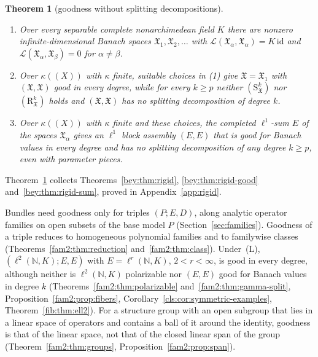 \documentclass[11pt]{amsart}
\theoremstyle{definition}
\theoremstyle{remark}
\numberwithin{equation}{section}
\newcommand{\N}{\mathbb N}
\newcommand{\cL}{\mathcal L}
\newcommand{\id}{\mathrm{id}}
\theoremstyle{plain}
\newtheorem{introtheorem}{Theorem}
\theoremstyle{definition}
\theoremstyle{plain}
\newcommand{\fX}{\mathfrak X}
\begin{document}
\begin{introtheorem}[goodness without splitting decompositions]\label{intro:thm:F}
\begin{enumerate}
\item Over every separable complete nonarchimedean field $K$ there are nonzero infinite-dimensional Banach spaces
$\fX_1,\fX_2,\dots$ with $\cL(\fX_\alpha,\fX_\alpha)=K\,\id$ and $\cL(\fX_\alpha,\fX_\beta)=0$ for $\alpha\ne\beta$.
\item Over $\kappa((X))$ with $\kappa$ finite, suitable choices in \textup{(1)} give $\fX=\fX_1$ with
$(\fX,\fX)$ good in every degree, while for every $k\ge p$ neither $(\mathrm S^k_{\fX})$ nor $(\mathrm R^k_{\fX})$
holds and $(\fX,\fX)$ has no splitting decomposition of degree $k$.
\item Over $\kappa((X))$ with $\kappa$ finite and these choices, the completed $\ell^1$-sum $E$ of the spaces $\fX_\alpha$
gives an $\ell^1$ block assembly $(E,E)$ that is good for Banach values in every degree and has no splitting
decomposition of any degree $k\ge p$, even with parameter pieces.
\end{enumerate}
\end{introtheorem}

Theorem~\ref{intro:thm:F} collects Theorems~\ref{bey:thm:rigid}, \ref{bey:thm:rigid-good} and~\ref{bey:thm:rigid-sum},
proved in Appendix~\ref{app:rigid}.

Bundles need goodness only for triples $(P;E,D)$, along analytic operator families on open subsets of the base model
$P$ (Section~\ref{sec:families}). Goodness of a triple reduces to homogeneous polynomial families and to familywise classes
(Theorems~\ref{fam2:thm:reduction} and~\ref{fam2:thm:class}). Under~\textup{(L)}, $(\ell^2(\N,K);E,E)$ with
$E=\ell^r(\N,K)$, $2<r<\infty$, is good in every degree, although neither is $\ell^2(\N,K)$ polarizable nor $(E,E)$
good for Banach values in degree $k$ (Theorems~\ref{fam2:thm:polarizable} and~\ref{fam2:thm:gamma-split},
Proposition~\ref{fam2:prop:fibers}, Corollary~\ref{cls:cor:symmetric-examples}, Theorem~\ref{fib:thm:ell2}). For a
structure group with an open subgroup that lies in a linear space of operators and contains a ball of it around the
identity, goodness is that of the linear space, not that of the closed linear span of the group
(Theorem~\ref{fam2:thm:groups}, Proposition~\ref{fam2:prop:span}).
\end{document}
